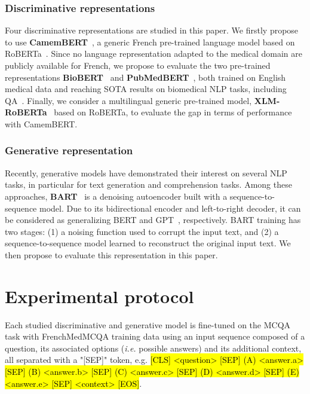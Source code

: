 \documentclass[11pt]{article}
\begin{document}
\subsubsection{Discriminative representations}

Four discriminative representations are studied in this paper. We firstly propose to use {\bf CamemBERT}~\cite{martin-etal-2020-camembert}, a generic French pre-trained language model based on RoBERTa~\cite{https://doi.org/10.48550/arxiv.1907.11692}. Since no language representation adapted to the medical domain are publicly available for French, we propose to evaluate the two pre-trained representations {\bf BioBERT}~\cite{Lee_2019} and {\bf PubMedBERT}~\cite{Gu_2022}, both trained on English medical data and reaching SOTA results on biomedical NLP tasks, including QA~\cite{pmlr-v174-pal22a}. Finally, we consider a multilingual generic pre-trained model, {\bf XLM-RoBERTa}~\cite{conneau-etal-2020-unsupervised} based on RoBERTa, to evaluate the gap in terms of performance with CamemBERT.








\subsubsection{Generative representation}
\label{s:generative}



Recently, generative models have demonstrated their interest on several NLP tasks, in particular for text generation and comprehension tasks. Among these approaches, {\bf BART}~\cite{https://doi.org/10.48550/arxiv.1910.13461} is a denoising autoencoder built with a sequence-to-sequence model. Due to its bidirectional encoder and left-to-right decoder, it can be considered as generalizing BERT and GPT~\cite{Radford2019LanguageMA}, respectively. BART training has two stages: (1) a noising function used to corrupt the input text, and (2) a sequence-to-sequence model learned to reconstruct the original input text. We then propose to evaluate this representation in this paper.


\section{Experimental protocol}
\label{s:experimental}


Each studied discriminative and generative model is fine-tuned on the MCQA task with FrenchMedMCQA training data using an input sequence composed of a question, its associated options ({\it i.e.} possible answers) and its additional context, all separated with a "[SEP]" token, e.g. \hl{[CLS] <question> [SEP] (A) <answer.a> [SEP] (B) <answer.b> [SEP] (C) <answer.c> [SEP] (D) <answer.d> [SEP] (E) <answer.e> [SEP] <context> [EOS]}. 
\end{document}
